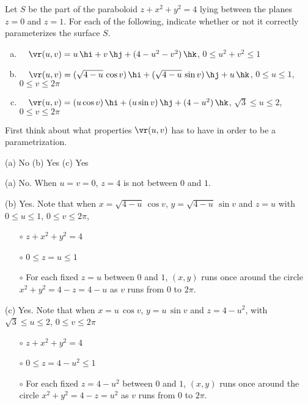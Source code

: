 \begin{question}[M317 2005D] %
Let $S$ be the part of the paraboloid $z + x^2 + y^2 = 4$ lying between
the planes $z = 0$ and $z = 1$. For each of the following, indicate 
whether or not it correctly parameterizes the surface $S$.
\begin{enumerate}[(a)]
\item\ \ 
$\vr(u,v) = u\,\hi + v\,\hj + (4 - u^2 - v^2)\,\hk$,\qquad
$0 \le u^2 + v^2 \le 1$
\item\ \ 
$\vr(u,v) = (\sqrt{4-u}\,\cos v)\,\hi + (\sqrt{4-u}\, \sin v)\,\hj + u\,\hk$,
\qquad
$0 \le u \le 1$, $0 \le v \le 2\pi$
\item\ \ 
$\vr(u, v) = (u \cos v)\,\hi + (u \sin v)\,\hj + (4 - u^2 )\,\hk$,\qquad
$\sqrt{3} \le u \le 2$, $0 \le v \le 2\pi$
\end{enumerate}
\end{question}

\begin{hint} 
First think about what properties $\vr(u,v)$ has to have in order to be
a parametrization.
\end{hint}

\begin{answer} 
(a) No\qquad
(b) Yes\qquad
(c) Yes
\end{answer}

\begin{solution}
(a) No. When $u=v=0$, $z=4$ is not between $0$ and $1$.

(b) Yes. Note that when $x=\sqrt{4-u}\,\cos v$,
                        $y=\sqrt{4-u}\,\sin v$ and
                        $z= u$ with
                        $0 \le u \le 1$, $0 \le v \le 2\pi$,
\begin{itemize}\itemsep1pt \parskip0pt \parsep0pt %
\item[$\circ$]
  $z+x^2+y^2=4$
\item[$\circ$]
  $0\le z=u\le 1$
\item[$\circ$]
  For each fixed $z=u$ between $0$ and $1$,
  $(x,y)$ runs once around the circle $x^2+y^2 =4-z =4-u$
   as $v$ runs from $0$ to $2\pi$.
\end{itemize}

(c) Yes. Note that when $x=u\,\cos v$,
                        $y=u\,\sin v$ and
                        $z= 4-u^2$, with
                        $\sqrt{3} \le u \le 2$, $0 \le v \le 2\pi$
\begin{itemize}\itemsep1pt \parskip0pt  %
\item[$\circ$]
  $z+x^2+y^2=4$
\item[$\circ$]
  $0\le z=4-u^2\le 1$
\item[$\circ$]
  For each fixed $z=4-u^2$ between $0$ and $1$,
  $(x,y)$ runs once around the circle $x^2+y^2 =4-z =u^2$
   as $v$ runs from $0$ to $2\pi$.
\end{itemize}

\end{solution}


